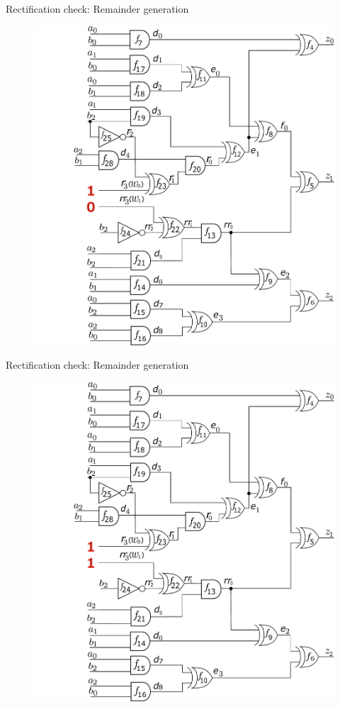 \begin{frame}{\large Rectification check: Remainder generation}
\begin{figure}[hbt]
\centering
    \includegraphics[scale = 0.28]{mas_3_ddc_mfr_b_01.pdf}
    \caption*{}
\end{figure}
\end{frame}

\begin{frame}{\large Rectification check: Remainder generation}
\begin{figure}[hbt]
\centering
    \includegraphics[scale = 0.28]{mas_3_ddc_mfr_b_11.pdf}
    \caption*{}
\end{figure}
\end{frame}


